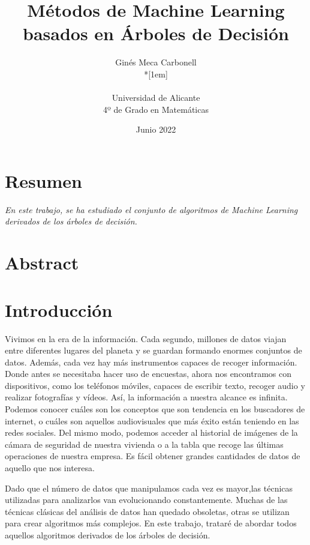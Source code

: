 \documentclass[12pt,twoside]{article}
\title{Métodos de Machine Learning basados en Árboles de Decisión}
\author{Ginés Meca Carbonell\\*[1em]
\begin{minipage}{0.75\textwidth}
\footnotesize \itshape
\begin{center}
Universidad de Alicante \\
4º de Grado en Matemáticas
\end{center}
\end{minipage}
}
\date{Junio 2022}
\begin{document}




\section*{Resumen}

\emph{En este trabajo, se ha estudiado el conjunto de algoritmos de Machine Learning derivados de los árboles de decisión.}

\newpage



\section*{Abstract}

\emph{}

\newpage



\tableofcontents



\newpage



\section{Introducción}

Vivimos en la era de la información. Cada segundo, millones de datos viajan entre diferentes lugares del planeta y se guardan formando enormes conjuntos de datos. Además, cada vez hay más instrumentos capaces de recoger información. Donde antes se necesitaba hacer uso de encuestas, ahora nos encontramos con dispositivos, como los teléfonos móviles, capaces de escribir texto, recoger audio y realizar fotografías y vídeos. Así, la información a nuestra alcance es infinita. Podemos conocer cuáles son los conceptos que son tendencia en los buscadores de internet, o cuáles son aquellos audiovisuales que más éxito están teniendo en las redes sociales. Del mismo modo, podemos acceder al historial de imágenes de la cámara de seguridad de nuestra vivienda o a la tabla que recoge las últimas operaciones de nuestra empresa. Es fácil obtener grandes cantidades de datos de aquello que nos interesa.

Dado que el número de datos que manipulamos cada vez es mayor,las técnicas utilizadas para analizarlos van evolucionando constantemente. Muchas de las técnicas clásicas del análisis de datos han quedado obsoletas, otras se utilizan para crear algoritmos más complejos. En este trabajo, trataré de abordar todos aquellos algoritmos derivados de los árboles de decisión.
\end{document}
